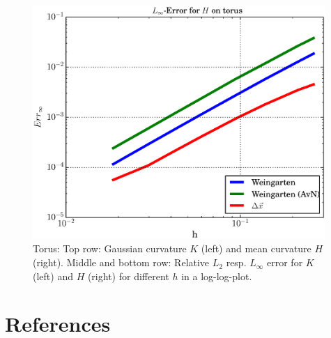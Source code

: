 \begin{figure}
\begin{minipage}[htp]{.23\textwidth}
      \includegraphics[width=0.99\textwidth]{bilder/torus/LMaxH.eps}
    \end{minipage}
    \caption{Torus: Top row: Gaussian curvature \( K \) (left) and mean curvature \( H \) (right).
                              Middle and bottom row: Relative \( L_{2} \) resp. \( L_{\infty} \) error for \( K \) (left) and
                                                     \( H \) (right) for different \( h \) in a log-log-plot.}
    \label{figTorus}
  \end{figure}



\section*{References}




